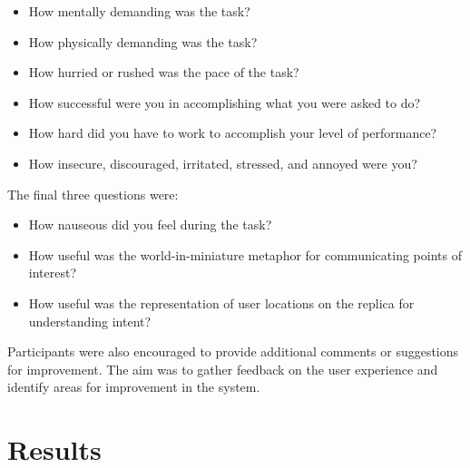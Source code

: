         \begin{itemize}
            \item How mentally demanding was the task?
            \item How physically demanding was the task?
            \item How hurried or rushed was the pace of the task?
            \item How successful were you in accomplishing what you were asked to do?
            \item How hard did you have to work to accomplish your level of performance?
            \item How insecure, discouraged, irritated, stressed, and annoyed were you?
        \end{itemize}

        The final three questions were:

        \begin{itemize}
            \item How nauseous did you feel during the task?
            \item How useful was the world-in-miniature metaphor for communicating points of interest?
            \item How useful was the representation of user locations on the replica for understanding intent?
        \end{itemize}

        Participants were also encouraged to provide additional comments or suggestions for improvement. The aim was to gather feedback on the user experience and identify areas for improvement in the system.

\section{Results}

